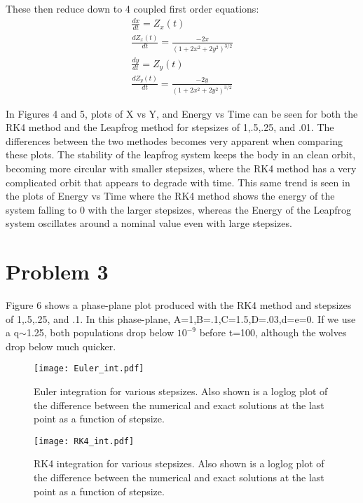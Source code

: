 \documentclass[a4paper,11pt]{article}
\begin{document}
These then reduce down to 4 coupled first order equations:
\begin{eqnarray}
  \frac{dx}{dt}=Z_x(t) \\
  \frac{dZ_x(t)}{dt}=\frac{-2x}{(1+2x^2+2y^2)^{3/2}}\\
  \frac{dy}{dt}=Z_y(t) \\
  \frac{dZ_y(t)}{dt}=\frac{-2y}{(1+2x^2+2y^2)^{3/2}}
\end{eqnarray}

In Figures 4 and 5, plots of X vs Y, and Energy vs Time can be seen for both the RK4 method and the Leapfrog method for stepsizes of 1,.5,.25, and .01.  The differences between the two methodes becomes very apparent when comparing these plots.  The stability of the leapfrog system keeps the body in an clean orbit, becoming more circular with smaller stepsizes, where the RK4 method has a very complicated orbit that appears to degrade with time.  This same trend is seen in the plots of Energy vs Time where the RK4 method shows the energy of the system falling to 0 with the larger stepsizes, whereas the Energy of the Leapfrog system oscillates around a nominal value even with large stepsizes. 



\section*{Problem 3}
Figure 6 shows a phase-plane plot produced with the RK4 method and stepsizes of 1,.5,.25, and .1.  In this phase-plane, A=1,B=.1,C=1.5,D=.03,d=e=0.  If we use a q$\sim$1.25, both populations drop below $10^{-9}$ before t=100, although the wolves drop below much quicker.


\begin{figure}[h!]
\begin{center}
\texttt{[image: Euler\_int.pdf]}
\caption{Euler integration for various stepsizes.  Also shown is a loglog plot of the difference between the numerical and exact solutions at the last point as a function of stepsize.}
\end{center}
\end{figure}

\begin{figure}[h!]
\begin{center}
\texttt{[image: RK4\_int.pdf]}
\caption{RK4 integration for various stepsizes.  Also shown is a loglog plot of the difference between the numerical and exact solutions at the last point as a function of stepsize.}
\end{center}
\end{figure}
\end{document}
